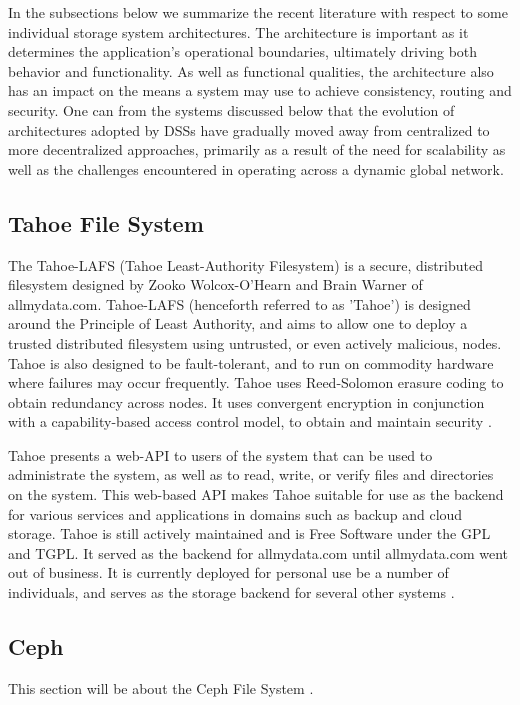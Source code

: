 \documentclass[11pt]{article}
\begin{document}
In the subsections below we summarize the recent literature with respect to 
some individual storage system architectures. The architecture is important 
as it determines the application’s operational boundaries, ultimately driving 
both  behavior and functionality. As well as functional qualities, the 
architecture also has an impact on the means a system may use to achieve 
consistency, routing and security. One can from the systems discussed below 
that the evolution of architectures adopted by DSSs have gradually moved away 
from centralized to more decentralized approaches, primarily as a result of 
the need for scalability as well as the challenges encountered in operating 
across a dynamic global network.


\subsection{Tahoe File System}

The Tahoe-LAFS (Tahoe Least-Authority Filesystem) is a secure,
distributed filesystem designed by Zooko Wolcox-O'Hearn and Brain
Warner of allmydata.com. Tahoe-LAFS (henceforth referred to as
'Tahoe') is designed around the Principle of Least Authority, and aims
to allow one to deploy a trusted distributed filesystem using
untrusted, or even actively malicious, nodes. Tahoe is also designed
to be fault-tolerant, and to run on commodity hardware where failures
may occur frequently. Tahoe uses Reed-Solomon erasure coding to obtain
redundancy across nodes. It uses convergent encryption in conjunction
with a capability-based access control model, to obtain and maintain
security \cite{WilcoxOHearn:2008p1275}.

Tahoe presents a web-API to users of the system that can be used to
administrate the system, as well as to read, write, or verify files
and directories on the system. This web-based API makes Tahoe suitable
for use as the backend for various services and applications in
domains such as backup and cloud storage. Tahoe is still actively
maintained and is Free Software under the GPL and TGPL. It served as the
backend for allmydata.com until allmydata.com went out of business. It
is currently deployed for personal use be a number of individuals, and
serves as the storage backend for several other
systems \cite{tahoe-lafs.org}. 

\subsection{Ceph}
This section will be about the Ceph File System
\cite{Weil:2012p1035,Weil:2012p1010,Weil:2006p1273}.

\nocite{*}

\end{document}

